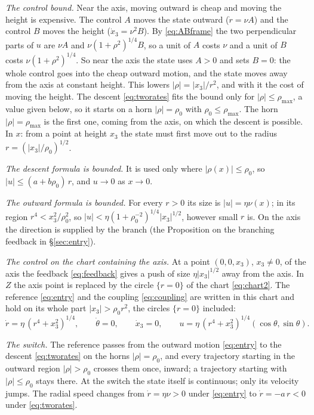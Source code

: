 \documentclass[11pt,reqno]{amsart}
\theoremstyle{plain}
\theoremstyle{definition}
\theoremstyle{remark}
\begin{document}
\emph{The control bound.} Near the axis, moving outward is cheap and moving the height is expensive. The control $A$ moves the state
outward ($\dot r=\nu A$) and the control $B$ moves the height ($\dot x_3=\nu^{2}B$). By \eqref{eq:ABframe}
the two perpendicular parts of $u$ are $\nu A$ and $\nu(1+\rho^{2})^{1/4}B$, so a unit of $A$ costs $\nu$
and a unit of $B$ costs $\nu(1+\rho^{2})^{1/4}$. So near the axis
the state uses $A>0$ and sets $B=0$: the whole control goes into the cheap outward motion, and
the state moves away from the axis at constant height. This lowers $|\rho|=|x_3|/r^{2}$, and with it the cost of moving the height. The descent
\eqref{eq:tworates} fits the bound only for $|\rho|\le\rho_{\max}$, a value given below, so
it starts on a horn $|\rho|=\rho_0$ with $\rho_0\le\rho_{\max}$. The horn $|\rho|=\rho_{\max}$ is the
first one, coming from the axis, on which the descent is possible. In $x$: from a point at height
$x_3$ the state must first move out to the radius $r=(|x_3|/\rho_0)^{1/2}$.

\emph{The descent formula is bounded.} It is used only where $|\rho(x)|\le\rho_0$, so
$|u|\le(a+b\rho_0)\,r$, and $u\to0$ as $x\to0$.

\emph{The outward formula is bounded.} For every $r>0$ its size is $|u|=\eta\nu(x)$; in its
region $r^{4}<x_3^{2}/\rho_0^{2}$, so $|u|<\eta(1+\rho_0^{-2})^{1/4}|x_3|^{1/2}$, however small $r$ is.
On the axis the direction is supplied by the branch (the Proposition on the branching feedback in \S\ref{sec:entry}).

\emph{The control on the chart containing the axis.} At a point $(0,0,x_3)$, $x_3\neq0$, of the axis the feedback
\eqref{eq:feedback} gives a push of size $\eta|x_3|^{1/2}$ away from the axis. In $Z$ the
axis point is replaced by the circle $\{r=0\}$ of the chart \eqref{eq:chart2}. The reference
\eqref{eq:entry} and the coupling \eqref{eq:coupling} are written in this chart and hold on its whole
part $|x_3|>\rho_0r^{2}$, the circles $\{r=0\}$ included:
\[
  \dot r=\eta\,(r^{4}+x_3^{2})^{1/4},\qquad \dot\theta=0,\qquad \dot x_3=0,\qquad
  u=\eta\,(r^{4}+x_3^{2})^{1/4}(\cos\theta,\sin\theta).
\]

\emph{The switch.} The reference passes from the outward motion \eqref{eq:entry} to the
descent \eqref{eq:tworates} on the horns $|\rho|=\rho_0$, and every trajectory starting in the outward region $|\rho|>\rho_0$ crosses them once, inward; a trajectory starting with $|\rho|\le\rho_0$ stays there. At the switch the state itself is continuous; only its velocity jumps.
The radial speed changes from $\dot r=\eta\nu>0$ under \eqref{eq:entry} to $\dot r=-a\,r<0$ under
\eqref{eq:tworates}.
\end{document}
